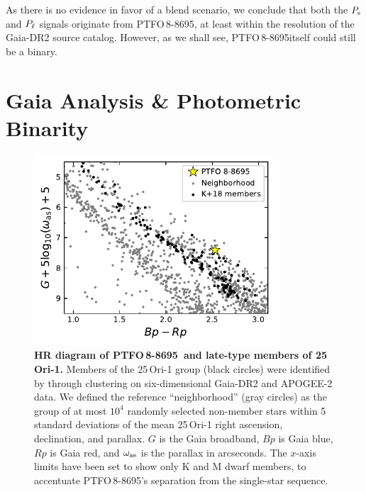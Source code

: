 \documentclass[12pt,twocolumn,tighten]{aastex62}
\newcommand{\ptfo}{PTFO$\,$8-8695}
\begin{document}
As there is no evidence in favor of a blend scenario, we conclude that
both the $P_{\rm s}$ and $P_{\rm \ell}$ signals originate from \ptfo,
at least within the resolution of the Gaia-DR2 source catalog.
However, as we shall see, \ptfo itself could still be a binary.


\section{Gaia Analysis \& Photometric Binarity}
\label{sec:gaia}

\begin{figure}[t]
	\begin{center}
		\leavevmode
		\includegraphics[width=0.8\textwidth]{f6.pdf}
	\end{center}
	\vspace{-0.7cm}
	\caption{ {\bf HR diagram of \ptfo\ and late-type members of 25$\,$Ori-1.}
  Members of the 25$\,$Ori-1 group (black circles) were identified by
  \citet{kounkel_apogee2_2018} through clustering on six-dimensional
  Gaia-DR2 and APOGEE-2 data.  We defined the reference
  ``neighborhood'' (gray circles) as the group of at most $10^4$
  randomly selected non-member stars within 5 standard deviations of
  the mean 25$\,$Ori-1 right ascension, declination, and parallax.
  $G$ is the Gaia broadband, $Bp$ is Gaia blue, $Rp$ is Gaia red, and
  $\omega_{\rm as}$ is the parallax in arcseconds.
  The $x$-axis limits have been set to show only K and M dwarf
  members, to accentuate \ptfo's separation from the
  single-star sequence.
	\label{fig:gaia}
	}
\end{figure}
\end{document}
